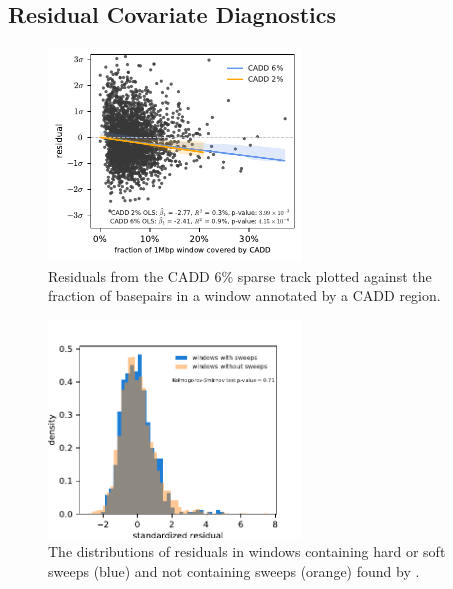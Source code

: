 \documentclass[11pt]{article}
\begin{document}
\subsection{Residual Covariate Diagnostics}

\begin{figure}[htbp]
  \centering
  \includegraphics[width=0.6\textwidth]{figures/supplementary/cadd_residual.pdf}
  \caption{Residuals from the CADD 6\% sparse track plotted against the fraction of
  basepairs in a window annotated by a CADD region.}
  \label{suppfig:resid-cadd}
\end{figure}

\begin{figure}[htbp]
  \centering
  \includegraphics[width=0.6\textwidth]{figures/supplementary/sweep_residuals.pdf}

  \caption{The distributions of residuals in windows containing hard or soft
  sweeps (blue) and not containing sweeps (orange) found by
\parencite{Schrider2017-yx}.}

  \label{suppfig:resid-sweeps}
\end{figure}
\end{document}
